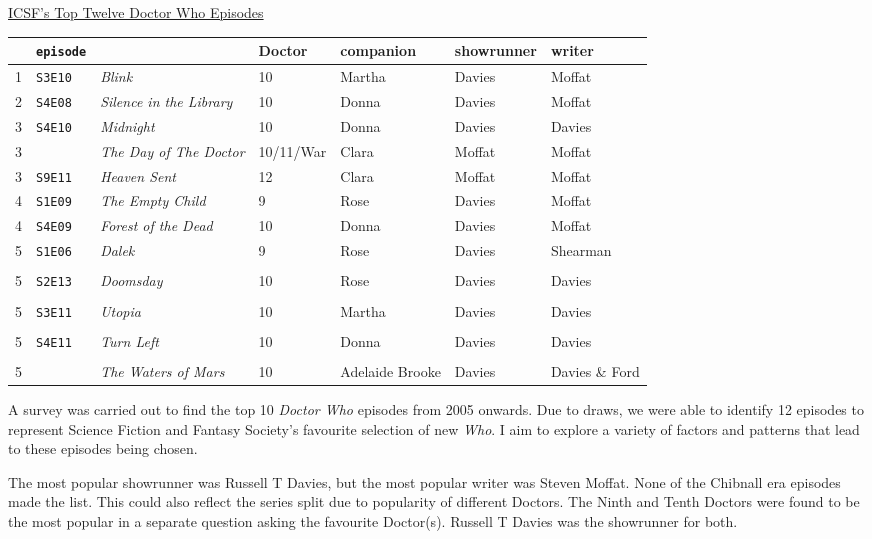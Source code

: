 \begin{center}
\begingroup
\ul{\sc ICSF's Top Twelve Doctor Who Episodes}
\endgroup
\vspace{1em}\\
\footnotesize
\begin{tabular}{r >{\tt}l l l l l l}
&{\normalfont episode}
&&Doctor&companion&showrunner&writer\\
\hline
1&S3E10&\emph{Blink}
&10&Martha&Davies&Moffat
\\
2&S4E08&\emph{Silence in the Library}
&10&Donna&Davies&Moffat
\\
3&S4E10&\emph{Midnight}
&10&Donna&Davies&Davies
\\
3&&\emph{The Day of The Doctor}
&10/11/War&Clara&Moffat&Moffat
\\
3&S9E11&\emph{Heaven Sent}
&12&Clara&Moffat&Moffat
\\
4&S1E09&\emph{The Empty Child}
&9&Rose&Davies&Moffat
\\
4&S4E09&\emph{Forest of the Dead}
&10&Donna&Davies&Moffat
\\
5&S1E06&\emph{Dalek}
&9&Rose&Davies&Shearman\\
\\
5&S2E13&\emph{Doomsday}
&10&Rose&Davies&Davies\\
\\
5&S3E11&\emph{Utopia}
&10&Martha&Davies&Davies\\
\\
5&S4E11&\emph{Turn Left}
&10&Donna&Davies&Davies\\
\\
5&&\emph{The Waters of Mars}
&10&Adelaide Brooke&Davies&Davies \& Ford
\end{tabular}
\end{center}
\vspace{2em}

A survey was carried out to find the top 10 \emph{Doctor Who} episodes from
2005 onwards. Due to draws, we were able to identify 12 episodes to represent
Science Fiction and Fantasy Society's favourite selection of new \emph{Who}. I
aim to explore a variety of factors and patterns that lead to these episodes
being chosen.

The most popular showrunner was Russell T Davies, but the most popular writer
was Steven Moffat. None of the Chibnall era episodes made the list. This could
also reflect the series split due to popularity of different Doctors. The Ninth
and Tenth Doctors were found to be the most popular in a separate question
asking the favourite Doctor(s). Russell T Davies was the showrunner for both.


